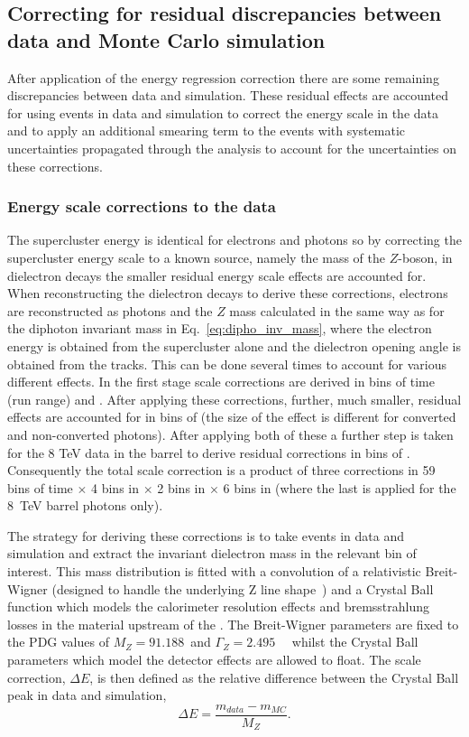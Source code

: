 \subsection{Correcting for residual discrepancies between data and Monte Carlo simulation}
\label{sec:scale_smearing}

After application of the energy regression correction there are some remaining discrepancies between data and \MC simulation. These residual effects are accounted for using \Zee events in data and simulation to correct the energy scale in the data and to apply an additional smearing term to the \MC events with systematic uncertainties propagated through the analysis to account for the uncertainties on these corrections.

\subsubsection{Energy scale corrections to the data}

The supercluster energy is identical for electrons and photons so by correcting the supercluster energy scale to a known source, namely the mass of the $Z$-boson, in dielectron decays the smaller residual energy scale effects are accounted for. When reconstructing the dielectron decays to derive these corrections, electrons are reconstructed as photons and the $Z$ mass calculated in the same way as for the diphoton invariant mass in Eq.~\ref{eq:dipho_inv_mass}, where the electron energy is obtained from the supercluster alone and the dielectron opening angle is obtained from the tracks. This can be done several times to account for various different effects. In the first stage scale corrections are derived in bins of time (run range) and \eta. After applying these corrections, further, much smaller, residual effects are accounted for in bins of \rnine (the size of the effect is different for converted and non-converted photons). After applying both of these a further step is taken for the 8 TeV data in the barrel to derive residual corrections in bins of \ET. Consequently the total scale correction is a product of three corrections in 59 bins of time $\times$ 4 bins in \eta $\times$ 2 bins in \rnine $\times$ 6 bins in \ET (where the last is applied for the 8~TeV barrel photons only).

The strategy for deriving these corrections is to take \Zee events in data and \MC simulation and extract the invariant dielectron mass in the relevant bin of interest. This mass distribution is fitted with a convolution of a relativistic Breit-Wigner (designed to handle the underlying Z line shape~\cite{pdg}) and a Crystal Ball function which models the calorimeter resolution effects and bremsstrahlung losses in the material upstream of the \ECAL. The Breit-Wigner parameters are fixed to the PDG values of $M_{Z}=91.188$~\GeV and $\Gamma_{Z}=2.495$~\GeV~\cite{pdg} whilst the Crystal Ball parameters which model the detector effects are allowed to float. The scale correction, $\Delta E$, is then defined as the relative difference between the Crystal Ball peak in data and simulation,
\begin{equation}
  \Delta E = \frac{m_{data}-m_{MC}}{M_{Z}}.
\end{equation}
